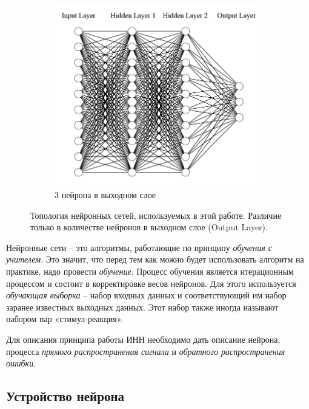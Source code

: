 \documentclass[a4paper,12pt]{article}
\theoremstyle{remark}
\begin{document}
\begin{figure}[h]
\begin{subfigure}{0.5\textwidth}
			\includegraphics[width=\linewidth]{nn_architecture2.png}
			\caption{3 нейрона в выходном слое}
		\end{subfigure}
		\caption{Топология нейронных сетей, используемых в этой работе. Различие только в количестве нейронов в выходном слое (Output Layer).}
		\label{fig:nn_architecture}
	\end{figure}

	Нейронные сети -- это алгоритмы, работающие по принципу \textit{обучения с учителем}. Это значит, что перед тем как можно будет использовать алгоритм на практике, надо провести \textit{обучение}. Процесс обучения является итерационным процессом и состоит в корректировке весов нейронов. Для этого используется \textit{обучающая выборка} -- набор входных данных и соответствующий им набор заранее известных выходных данных. Этот набор также иногда называют набором пар «стимул-реакция».
	
	Для описания принципа работы ИНН необходимо дать описание нейрона, процесса \textit{прямого распространения сигнала} и \textit{обратного распространения ошибки}.
	
	\subsection{Устройство нейрона}
\end{document}
